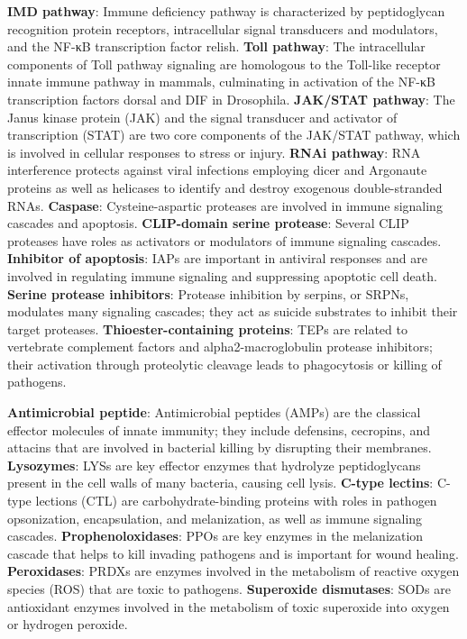 \documentclass[11pt]{article}
\begin{document}
\textbf{IMD pathway}: Immune deficiency pathway is characterized by peptidoglycan recognition protein receptors, intracellular signal transducers and modulators, and the NF-κB transcription factor relish.
\newline
\textbf{Toll pathway}: The intracellular components of Toll pathway signaling are homologous to the Toll-like receptor innate immune pathway in mammals, culminating in activation of the NF-κB transcription factors dorsal and DIF in Drosophila.
\newline
\textbf{JAK/STAT pathway}: The Janus kinase protein (JAK) and the signal transducer and activator of transcription (STAT) are two core components of the JAK/STAT pathway, which is involved in cellular responses to stress or injury.
\newline
\textbf{RNAi pathway}: RNA interference protects against viral infections employing dicer and Argonaute proteins as well as helicases to identify and destroy exogenous double-­stranded RNAs.
\newline
\textbf{Caspase}: Cysteine-aspartic proteases are involved in immune signaling cascades and apoptosis.
\newline
\textbf{CLIP-domain serine protease}: Several CLIP proteases have roles as activators or modulators of
immune signaling cascades.
\newline
\textbf{Inhibitor of apoptosis}: IAPs are important in antiviral responses and are involved in regulating immune signaling and suppressing apoptotic cell death.
\newline
\textbf{Serine protease inhibitors}: Protease inhibition by serpins, or SRPNs, modulates many
signaling cascades; they act as suicide substrates to inhibit their target proteases.
\newline
\textbf{Thioester-containing proteins}: TEPs are related to vertebrate complement factors and
alpha2-macroglobulin protease inhibitors; their activation through proteolytic cleavage leads to phagocytosis or killing of pathogens.
\newline

\textbf{Antimicrobial peptide}: Antimicrobial peptides (AMPs) are the classical effector molecules of innate immunity; they include defensins, cecropins, and attacins that are involved in bacterial killing by disrupting their membranes.
\newline
\textbf{Lysozymes}: LYSs are key effector enzymes that hydrolyze peptidoglycans present in the cell walls of many bacteria, causing cell lysis.
\newline
\textbf{C-type lectins}: C-type lections (CTL) are carbohydrate-­binding proteins with roles in pathogen opsonization, encapsulation, and melanization, as well as immune signaling cascades.
\newline
\textbf{Prophenoloxidases}: PPOs are key enzymes in the melanization cascade that helps to
kill invading pathogens and is important for wound healing.
\newline
\textbf{Peroxidases}: PRDXs are enzymes involved in the metabolism of reactive oxygen species (ROS) that are toxic to pathogens.
\newline
\textbf{Superoxide dismutases}: SODs are antioxidant enzymes involved in the metabolism of toxic superoxide into oxygen or hydrogen peroxide.
\end{document}
